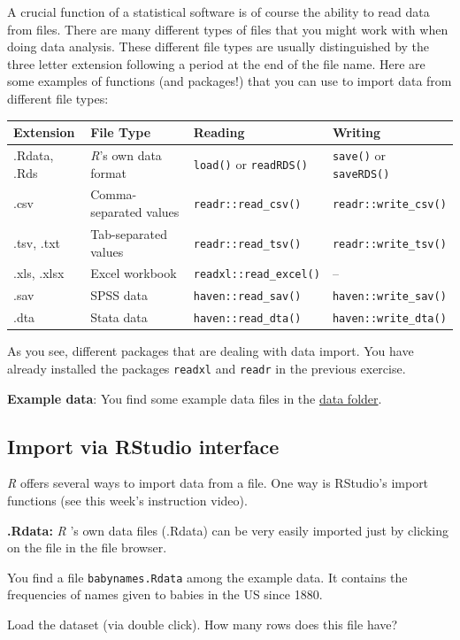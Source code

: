 \documentclass[
]{scrartcl}
\makeatletter
\newenvironment{kframe}{%
\medskip{}
\setlength{\fboxsep}{.8em}
 \def\at@end@of@kframe{}%
 \ifinner\ifhmode%
  \def\at@end@of@kframe{\end{minipage}}%
  \begin{minipage}{\columnwidth}%
 \fi\fi%
 \def\FrameCommand##1{\hskip\@totalleftmargin \hskip-\fboxsep
 \colorbox{shadecolor}{##1}\hskip-\fboxsep
     \hskip-\linewidth \hskip-\@totalleftmargin \hskip\columnwidth}%
 \MakeFramed {\advance\hsize-\width
   \@totalleftmargin\z@ \linewidth\hsize
   \@setminipage}}%
 {\par\unskip\endMakeFramed%
 \at@end@of@kframe}
\newenvironment{rmdblock}[1]
  {
  \begin{itemize}
  \renewcommand{\labelitemi}{
    \raisebox{-.7\height}[0pt][0pt]{
      {\setkeys{Gin}{width=3em,keepaspectratio}\texttt{[image: images/\#1]}}
    }
  }
  \setlength{\fboxsep}{1em}
  \begin{kframe}
  \item
  }
  {
  \end{kframe}
  \end{itemize}
  }
\newenvironment{myexercise}
    {\begin{rmdblock}{exercise_green}}
    {\end{rmdblock}}
\makeatother
\begin{document}
A crucial function of a statistical software is of course the ability to read data from files. There are many different types of files that you might work with when doing data analysis. These different file types are usually distinguished by the three letter extension following a period at the end of the file name. Here are some examples of functions (and packages!) that you can use to import data from different file types:

\begin{longtable}[]{@{}llll@{}}
\toprule
Extension & File Type & Reading & Writing\tabularnewline
\midrule
\endhead
.Rdata, .Rds & \emph{R}'s own data format & \texttt{load()} or \texttt{readRDS()} & \texttt{save()} or \texttt{saveRDS()}\tabularnewline
.csv & Comma-separated values & \texttt{readr::read\_csv()} & \texttt{readr::write\_csv()}\tabularnewline
.tsv, .txt & Tab-separated values & \texttt{readr::read\_tsv()} & \texttt{readr::write\_tsv()}\tabularnewline
.xls, .xlsx & Excel workbook & \texttt{readxl::read\_excel()} & --\tabularnewline
.sav & SPSS data & \texttt{haven::read\_sav()} & \texttt{haven::write\_sav()}\tabularnewline
.dta & Stata data & \texttt{haven::read\_dta()} & \texttt{haven::write\_dta()}\tabularnewline
\bottomrule
\end{longtable}

As you see, different packages that are dealing with data import. You have already installed the packages \texttt{readxl} and \texttt{readr} in the previous exercise.

\textbf{Example data}: You find some example data files in the \href{./data}{data folder}.

\hypertarget{import-via-rstudio-interface}{%
\subsection{Import via RStudio interface}\label{import-via-rstudio-interface}}

\emph{R} offers several ways to import data from a file. One way is RStudio's import functions (see this week's instruction video).

\textbf{.Rdata:} \emph{R} 's own data files (.Rdata) can be very easily imported just by clicking on the file in the file browser.

\begin{myexercise}
You find a file \texttt{babynames.Rdata} among the example data. It
contains the frequencies of names given to babies in the US since 1880.

Load the dataset (via double click). How many rows does this file have?
\end{myexercise}
\end{document}

